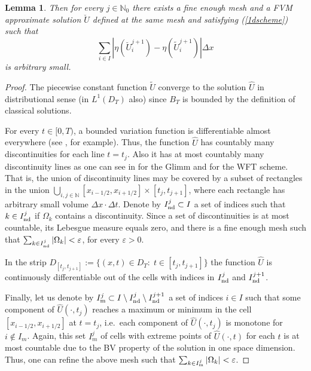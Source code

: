\documentclass[11pt,a4paper,reqno]{amsart}
\theoremstyle{plain}
\newtheorem{lemma}{Lemma}[section]
\theoremstyle{definition}
\theoremstyle{remark}
\numberwithin{equation}{section}
\begin{document}
{\begin{lemma}
Then for every $j\in \mathbb{N}_{0}$ 
there exists a fine enough mesh and a FVM approximate solution 
$\breve{U}$ defined at the same mesh and satisfying (\ref{1dscheme}) such that 
\begin{equation}\label{s}
\sum_{i\in I}|\eta(\breve{U}_{i}^{j+1})-\eta(\widetilde{U}_{i}^{j+1})|\Delta x
\end{equation}
is arbitrary small.
\end{lemma}

\begin{proof}
The piecewise constant function $\widetilde{U}$ converge to 
the solution $\widehat{U}$ in 
distributional sense (in $L^{1}(D_{T})$ also) since $B_{T}$ 
is bounded by the definition of classical solutions. 

For every $t\in[0,T)$, a bounded variation function is
differentiable almost everywhere (see \cite{RoFi}, for example). 
Thus, the function $\widehat{U}$ has countably many discontinuities
for each line $t=t_{j}$. Also it has at most countably many discontinuity lines
as one can see in \cite{Diperna}
for the Glimm and \cite{Bressan} for the WFT scheme.
That is, the union of discontinuity lines may be covered by a subset of rectangles
in the union $\bigcup_{i,j \in \mathbb{N}} [x_{i-1/2},x_{i+1/2}] 
\times [t_{j},t_{j+1}]$, where 
each rectangle has arbitrary small volume 
$\Delta x \cdot \Delta t$. 
Denote by $I_{\rm nd}^{j}\subset I$ a set of indices such that  
$k\in I_{\rm nd}^{j}$ if $\Omega_{k}$ contains a discontinuity. Since a set of discontinuities
is at most countable, its Lebesgue measure equals zero, 
and there is a fine enough mesh such that 
$\sum_{k\in I_{\rm nd}^{j}}|\Omega_{k}| < \varepsilon$, 
for every  $\varepsilon>0$. 

In the strip $D_{[t_{j},t_{j+1}]}:=\{ (x,t)\in D_{T}:\; t\in [t_{j},t_{j+1}]\}$ 
the function $\widehat{U}$ is continuously
differentiable out of the cells with indices in $I_{\rm nd}^{j}$ and
$I_{\rm nd}^{j+1}$. 

Finally, let us denote by $I_{\rm m}^{j}\subset I \setminus I_{\rm nd}^{j} 
\setminus I_{\rm nd}^{j+1}$ a set of indices 
$i\in I$ such that some component of $\widehat{U}(\cdot,t_{j})$ reaches 
a maximum or minimum in the cell  
$[x_{i-1/2},x_{i+1/2}]$ at $t=t_{j}$, 
i.e.\ each component of $\widehat{U}(\cdot,t_{j})$ is monotone 
for $i \not\in I_{m}$. Again, this set $I_{m}^{j}$ 
of cells with extreme points of $\widehat{U}(\cdot,t)$ for each $t$ 
is at most countable due to the BV property of the solution in one space 
dimension. Thus, one can refine the above mesh such that
$\sum_{k\in I_{\rm m}^{j}}|\Omega_{k}| < \varepsilon$.


\end{proof}}
\end{document}
